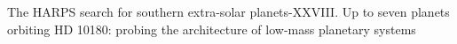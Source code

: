 




\begin{workout}
The HARPS search for southern extra-solar planets-XXVIII. Up to seven planets orbiting HD 10180: probing the architecture of low-mass planetary systems
\end{workout}
